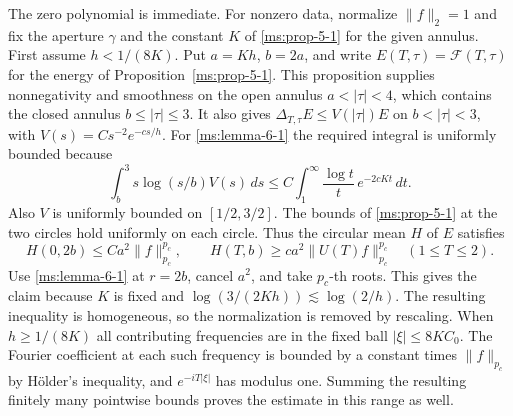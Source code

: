 The zero polynomial is immediate. For nonzero data, normalize
\(\|f\|_2=1\) and fix the aperture \(\gamma\) and the constant
\(K\) of \ref{ms:prop-5-1} for the given annulus. First assume
\(h<1/(8K)\). Put \(a=Kh\), \(b=2a\), and write
\(E(T,\tau)=\mathcal F(T,\tau)\) for the energy of Proposition~\ref{ms:prop-5-1}. This proposition supplies nonnegativity and smoothness on the open annulus \(a<|\tau|<4\), which contains the closed annulus \(b\le|\tau|\le3\). It also gives
\(\Delta_{T,\tau}E\le V(|\tau|)E\) on \(b<|\tau|<3\), with
\(V(s)=Cs^{-2}e^{-cs/h}\). For \ref{ms:lemma-6-1} the required
integral is uniformly bounded because
\[
 \int_b^3s\log(s/b)V(s)\,ds
 \le C\int_1^\infty \frac{\log t}{t}\,e^{-2cKt}\,dt .
\]
Also \(V\) is uniformly bounded on \([1/2,3/2]\). The bounds of
\ref{ms:prop-5-1} at the two circles hold uniformly on each
circle. Thus the circular mean \(H\) of \(E\) satisfies
\[
 H(0,2b)\le Ca^2\|f\|_{p_c}^{p_c},\qquad
 H(T,b)\ge ca^2\|U(T)f\|_{p_c}^{p_c}\quad(1\le T\le2).
\]
Use \ref{ms:lemma-6-1} at \(r=2b\), cancel \(a^2\), and take
\(p_c\)-th roots. This gives the claim because \(K\) is fixed and
\(\log(3/(2Kh))\lesssim\log(2/h)\).
The resulting inequality is homogeneous, so the normalization is
removed by rescaling. When \(h\ge1/(8K)\) all contributing
frequencies are in the fixed ball \(|\xi|\le8KC_0\).
The Fourier coefficient at each such frequency is bounded by
a constant times \(\|f\|_{p_c}\) by Hölder's inequality, and
\(e^{-iT|\xi|}\) has modulus one. Summing the resulting finitely
many pointwise bounds proves the estimate in this range as well.
